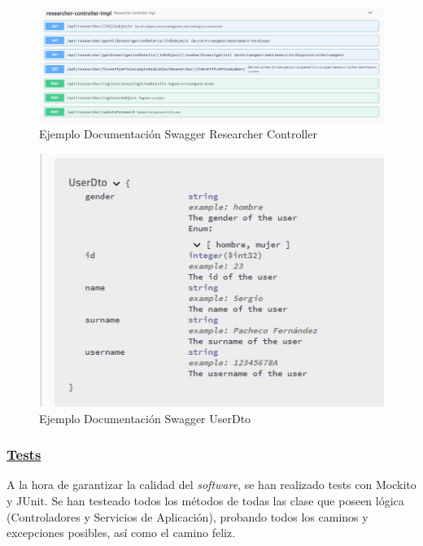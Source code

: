           \begin{figure}[h]
            \centering
            \includegraphics[width=1\textwidth]{images/swaggerendpoint.JPG}
            \caption{Ejemplo Documentación Swagger Researcher Controller}
        \end{figure}
        
        \begin{figure}[h]
            \centering
            \includegraphics[width=1\textwidth]{images/swaggeruserdto.JPG}
            \caption{Ejemplo Documentación Swagger UserDto}
        \end{figure}
        
        \FloatBarrier
        
        
        \subsubsection{\underline{Tests}}
        A la hora de garantizar la calidad del \textit{software}, se han realizado tests con Mockito y JUnit. Se han testeado todos los métodos de todas las clase que poseen lógica (Controladores y Servicios de Aplicación), probando todos los caminos y excepciones posibles, así como el camino feliz.
        \newline
        
